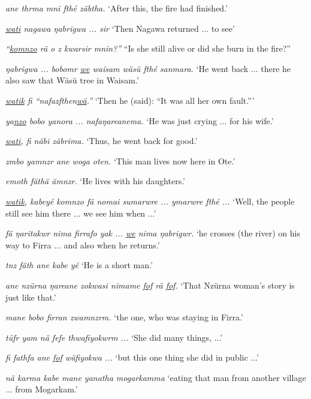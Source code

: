 \begin{exe}
	\ex
	\begin{xlist}

	 \emph{ane thrma mni fthé zäbtha.}
	\trans `After this, the fire had finished.'

	 \emph{\underline{wati} nagawa ŋabrigwa ... sir}
	\trans `Then Nagawa returned ... to see'

	 \emph{``\underline{komnzo} rä o z kwarsir mnin?''}
	\trans ``Is she still alive or did she burn in the fire?''

	 \emph{ŋabrigwa ... bobomr \underline{we} waisam wäsü fthé sanmara.}
	\trans `He went back ... there he also saw that Wäsü tree in Waisam.'

	 \emph{\underline{watik} fi ``nafazfthen\underline{wä}.''}
	\trans `Then he (said): ``It was all her own fault.'''

	 \emph{ya\underline{nzo} bobo yanora ... nafaŋareanema.}
	\trans `He was just crying ... for his wife.'

	 \emph{\underline{wati}, fi näbi zäbrima.}
	\trans `Thus, he went back for good.'

	 \emph{zmbo yamnzr ane woga oten.}
	\trans `This man lives now here in Ote.'

	 \emph{emoth fäthä ämnzr.}
	\trans `He lives with his daughters.'

	 \emph{\underline{watik}, kabeyé komnzo fä nomai sumarwre ... ymarwre fthé ...}
	\trans `Well, the people still see him there ... we see him when ...'

	 \emph{fä ŋaritakwr nima firrafo yak ... \underline{we} nima ŋabrigwr.}
	\trans `he crosses (the river) on his way to Firra ... and also when he returns.'

	 \emph{tnz fäth ane kabe yé}
	\trans `He is a short man.'

	 \emph{ane nzürna ŋareane zokwasi nimame \underline{fof} rä \underline{fof}.}
	\trans `That Nzürna woman's story is just like that.'

	 \emph{mane bobo firran zwamnzrm.}
	\trans `the one, who was staying in Firra.'

	 \emph{tüfr yam nä fefe thwafiyokwrm ...}
	\trans `She did many things, ...'

	 \emph{fi fathfa ane \underline{fof} wäfiyokwa ...}
	\trans `but this one thing she did in public ...'

	 \emph{nä karma kabe mane yanatha mogarkamma}
	\trans `eating that man from another village ... from Mogarkam.'


\end{xlist}
\end{exe}
